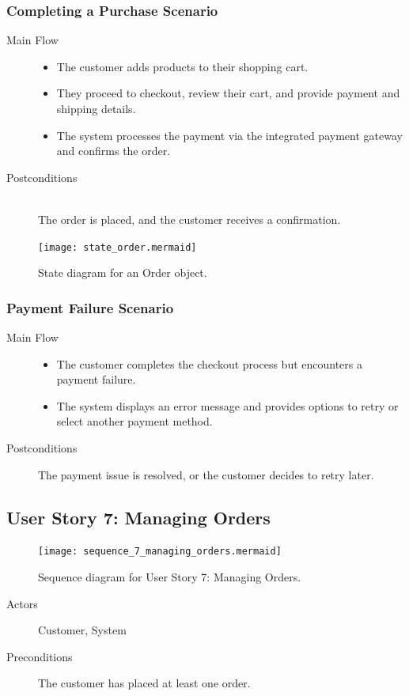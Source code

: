 \documentclass[twoside,a4paper,journal]{IEEEtran}
\begin{document}
\subsubsection{Completing a Purchase Scenario}
\begin{description}
  \item[Main Flow] \hfill
    \begin{itemize}
      \item The customer adds products to their shopping cart.
      \item They proceed to checkout, review their cart, and provide payment and
        shipping details.
      \item The system processes the payment via the integrated payment gateway
        and confirms the order.
    \end{itemize}
  \item[Postconditions] \hfill \\
    The order is placed, and the customer receives a confirmation.
\end{description}
\begin{figure}[!t]
\centering
\texttt{[image: state\_order.mermaid]}
\caption{State diagram for an Order object.}
\label{fig:state_order}
\end{figure}
\subsubsection{Payment Failure Scenario}
\begin{description}
  \item[Main Flow] \hfill
    \begin{itemize}
      \item The customer completes the checkout process but encounters a payment
        failure.
      \item The system displays an error message and provides options to retry
        or select another payment method.
    \end{itemize}
  \item[Postconditions]
    The payment issue is resolved, or the customer decides to retry later.
\end{description}
\subsection{User Story 7: Managing Orders}
\begin{figure}[!t]
\centering
\texttt{[image: sequence\_7\_managing\_orders.mermaid]}
\caption{Sequence diagram for User Story 7: Managing Orders.}
\label{fig:sequence_7}
\end{figure}
\begin{description}
  \item[Actors] Customer, System
  \item[Preconditions] \hfill
    The customer has placed at least one order.
\end{description}
\end{document}
